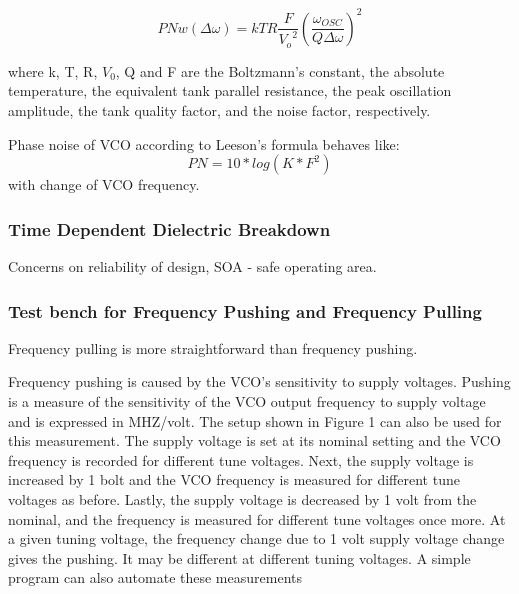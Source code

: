 \begin{equation}
	PNw(\Delta \omega) = kTR \dfrac{F}{{V_o}^2} {(\dfrac{\omega_{OSC}}{Q \Delta \omega})}^2
\end{equation}

where k, T, R, $V_0$, Q and F are the Boltzmann's constant, the absolute temperature, the equivalent tank parallel resistance, the peak oscillation amplitude, the tank quality factor, and the noise factor, respectively.

Phase noise of VCO according to Leeson's formula behaves like:
\begin{equation}
	PN = 10 * log(K* F^2)
\end{equation}
with change of VCO frequency.

\begin{question}
	
\end{question}

\subsubsection*{Time Dependent Dielectric Breakdown}

Concerns on reliability of design, SOA - safe operating area.

\subsubsection*{Test bench for Frequency Pushing and Frequency Pulling}

Frequency pulling is more straightforward than frequency pushing. 

\begin{info}
	Frequency pushing is caused by the VCO's sensitivity to supply voltages. Pushing is a measure of the sensitivity of the VCO output frequency to supply voltage and is expressed in MHZ/volt. The setup	shown in Figure 1 can also be used for this measurement. The supply voltage is set at its nominal	setting and the VCO frequency is recorded for different tune voltages. Next, the supply voltage is increased by 1 bolt and the VCO frequency is measured for different tune voltages as before. Lastly, the supply voltage is decreased by 1 volt from the nominal, and the frequency is measured for different tune voltages once more. At a given tuning voltage, the frequency change due to 1 volt supply voltage change gives the pushing. It may be different at different tuning voltages. A simple program can also automate these measurements
		
\end{info}


